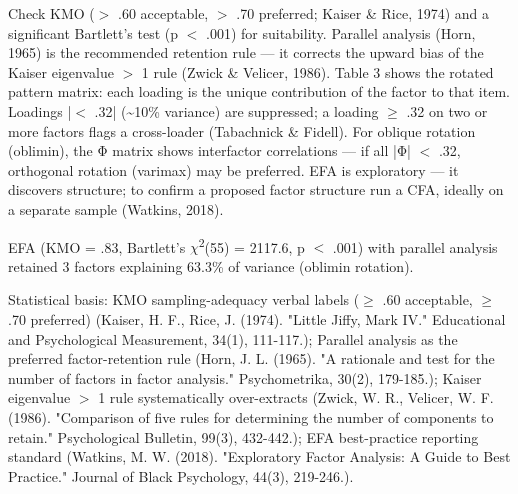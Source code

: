 \documentclass{article}
\begin{document}
Check KMO ($>$ .60 acceptable, $>$ .70 preferred; Kaiser \& Rice, 1974) and a significant Bartlett's test (p $<$ .001) for suitability. Parallel analysis (Horn, 1965) is the recommended retention rule --- it corrects the upward bias of the Kaiser eigenvalue $>$ 1 rule (Zwick \& Velicer, 1986). Table 3 shows the rotated pattern matrix: each loading is the unique contribution of the factor to that item. Loadings |$<$ .32| (\textasciitilde{}10\% variance) are suppressed; a loading $\ge$ .32 on two or more factors flags a cross-loader (Tabachnick \& Fidell). For oblique rotation (oblimin), the Φ matrix shows interfactor correlations --- if all |Φ| $<$ .32, orthogonal rotation (varimax) may be preferred. EFA is exploratory --- it discovers structure; to confirm a proposed factor structure run a CFA, ideally on a separate sample (Watkins, 2018).

EFA (KMO = .83, Bartlett's $\chi$\textsuperscript{2}(55) = 2117.6, p $<$ .001) with parallel analysis retained 3 factors explaining 63.3\% of variance (oblimin rotation).

Statistical basis: KMO sampling-adequacy verbal labels ($\ge$ .60 acceptable, $\ge$ .70 preferred) (Kaiser, H. F., Rice, J. (1974). "Little Jiffy, Mark IV." Educational and Psychological Measurement, 34(1), 111-117.); Parallel analysis as the preferred factor-retention rule (Horn, J. L. (1965). "A rationale and test for the number of factors in factor analysis." Psychometrika, 30(2), 179-185.); Kaiser eigenvalue $>$ 1 rule systematically over-extracts (Zwick, W. R., Velicer, W. F. (1986). "Comparison of five rules for determining the number of components to retain." Psychological Bulletin, 99(3), 432-442.); EFA best-practice reporting standard (Watkins, M. W. (2018). "Exploratory Factor Analysis: A Guide to Best Practice." Journal of Black Psychology, 44(3), 219-246.).
\end{document}
